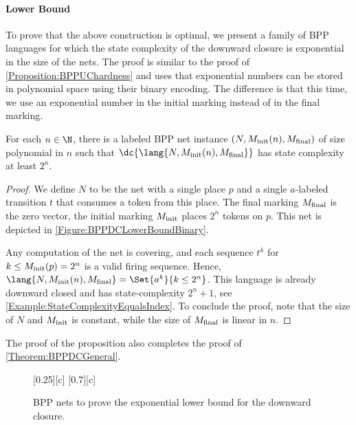 \documentclass[../../diss.tex]{subfiles}
\begin{document}
\paragraph{Lower Bound}

To prove that the above construction is optimal, we present a family of BPP languages for which the state complexity of the downward closure is exponential in the size of the nets.
The proof is similar to the proof of \cref{Proposition:BPPUChardness} and uses that exponential numbers can be stored in polynomial space using their binary encoding.
The difference is that this time, we use an exponential number in the initial marking instead of in the final marking.

\begin{proposition}%
\label{Propositition:BPPDCHardness}%
    For each $n \in \N$, there is a labeled BPP net instance $(N, M_{\text{init}}(n), M_{\text{final}})$ of size polynomial in $n$ such that $\dc{\lang{N, \Minit(n), \Mfinal}}$ has state complexity at least $2^n$.
\end{proposition}

\begin{proof}
    We define $N$ to be the net with a single place $p$ and a single $a$-labeled transition $t$ that consumes a token from this place.
    The final marking $M_{\text{final}}$ is the zero vector, the initial marking $M_{\text{init}}$ places $2^n$ tokens on $p$.
    This net is depicted in \cref{Figure:BPPDCLowerBoundBinary}.

    Any computation of the net is covering, and each sequence $t^k$ for $k \leq M_{\text{init}}(p) = 2^n$ is a valid firing sequence.
    Hence, $\lang{N, \Minit(n), \Mfinal} = \Set{ a^k }{ k \leq 2^n}$.
    This language is already downward closed and has state-complexity $2^n + 1$, see \cref{Example:StateComplexityEqualsIndex}.
    To conclude the proof, note that the size of $N$ and $M_{\text{init}}$ is constant, while the size of $M_{\text{final}}$ is linear in $n$.
\end{proof}

The proof of the proposition also completes the proof of \cref{Theorem:BPPDCGeneral}.

\begin{figure}[t]
    {\centering{}[0.25\textwidth][c]{
        }
    }
    {\centering{}[0.7\textwidth][c]{
        }
    }
    \caption{BPP nets to prove the exponential lower bound for the downward closure.}%
    \label{Figure:BPPDCLowerBound}%
\end{figure}
\end{document}
